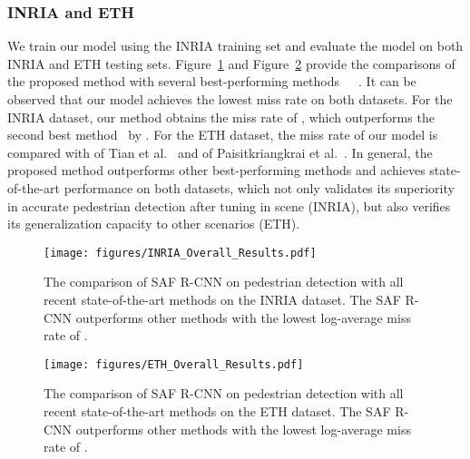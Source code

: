 \documentclass[journal]{IEEEtran}
\begin{document}
\subsubsection{INRIA and ETH}
We train our model using the INRIA training set and evaluate the model on both INRIA and ETH testing sets. Figure~\ref{fig:INRIA_Overall_Results} and Figure~\ref{fig:ETH_Overall_Results} provide the comparisons of the proposed method with several best-performing methods~\cite{paisitkriangkrai2014strengthening}~\cite{ta_cnn}~\cite{dollar2014fast}. It can be observed that our model achieves the lowest miss rate on both datasets. For the INRIA dataset, our method obtains the miss rate of , which outperforms the second best method~\cite{paisitkriangkrai2014strengthening} by . For the ETH dataset, the miss rate of our model is  compared with  of Tian et al.~\cite{ta_cnn} and  of Paisitkriangkrai et al.~\cite{paisitkriangkrai2014strengthening}. In general, the proposed method outperforms other best-performing methods and achieves state-of-the-art performance on both datasets, which not only validates its superiority in accurate pedestrian detection after tuning in scene (INRIA), but also verifies its generalization capacity to other scenarios (ETH).

\begin{figure}
	\begin{center}
		\texttt{[image: figures/INRIA\_Overall\_Results.pdf]}
		\caption{{The comparison of SAF R-CNN on pedestrian detection with all recent state-of-the-art methods on the INRIA dataset. The SAF R-CNN outperforms other methods with the lowest log-average miss rate of .}}
		\label{fig:INRIA_Overall_Results}
	\end{center}
	\vspace{-4mm}
\end{figure}

\begin{figure}
	\begin{center}
		\texttt{[image: figures/ETH\_Overall\_Results.pdf]}
		\caption{{The comparison of SAF R-CNN on pedestrian detection with all recent state-of-the-art methods on the ETH dataset. The SAF R-CNN outperforms other methods with the lowest log-average miss rate of .}}
		\label{fig:ETH_Overall_Results}
	\end{center}
	\vspace{-4mm}
\end{figure}
\end{document}
